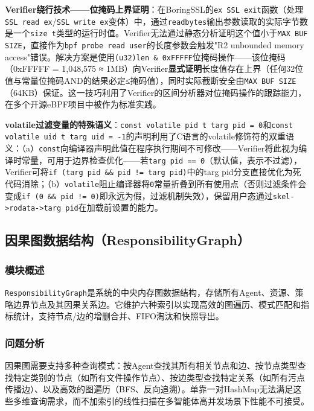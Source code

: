 \documentclass[a4paper]{ctexart}
\makeatletter
\renewcommand{\_}{%
  \ifmmode
    \nfss@text{\textunderscore}%
  \else
    \textunderscore\discretionary{}{}{}%
  \fi}
\makeatother
\begin{document}
\textbf{Verifier绕行技术——位掩码上界证明}：在BoringSSL的\texttt{ex\_SSL\_exit}函数（处理\texttt{SSL\_read\_ex}/\texttt{SSL\_write\_ex}变体）中，通过\texttt{readbytes}输出参数读取的实际字节数是一个\texttt{size\_t}类型的运行时值。Verifier无法通过静态分析证明这个值小于\texttt{MAX\_BUF\_SIZE}，直接作为\texttt{bpf\_probe\_read\_user}的长度参数会触发"R2 unbounded memory access"错误。解决方案是使用\texttt{(u32)len \& 0xFFFFF}位掩码操作——该位掩码（0xFFFFF = 1,048,575 ≈ 1MB）向Verifier\textbf{显式证明}长度值存在上界（任何32位值与常量位掩码AND的结果必定≤掩码值），同时实际截断安全由\texttt{MAX\_BUF\_SIZE}（64KB）保证。这一技巧利用了Verifier的区间分析器对位掩码操作的跟踪能力，在多个开源eBPF项目中被作为标准实践。


\textbf{volatile过滤变量的特殊语义}：\texttt{const volatile pid\_t targ\_pid = 0}和\texttt{const volatile uid\_t targ\_uid = -1}的声明利用了C语言的volatile修饰符的双重语义：（a）\texttt{const}向编译器声明此值在程序执行期间不可修改——Verifier将此视为编译时常量，可用于边界检查优化——若\texttt{targ\_pid == 0}（默认值，表示不过滤），Verifier可将\texttt{if (targ\_pid \&\& pid != targ\_pid)}中的targ\_pid分支直接优化为死代码消除；（b）\texttt{volatile}阻止编译器将\texttt{0}常量折叠到所有使用点（否则过滤条件会变成\texttt{if (0 \&\& pid != 0)}即永远为假，过滤机制失效），保留用户态通过\texttt{skel->rodata->targ\_pid}在加载前设置的能力。


\subsection{因果图数据结构（ResponsibilityGraph）}



\subsubsection{模块概述}



\texttt{ResponsibilityGraph}是系统的中央内存图数据结构，存储所有Agent、资源、策略边界节点及其因果关系边。它维护六种索引以实现高效的图遍历、模式匹配和指标统计，支持节点/边的增删合并、FIFO淘汰和快照导出。


\subsubsection{问题分析}



因果图需要支持多种查询模式：按Agent查找其所有相关节点和边、按节点类型查找特定类别的节点（如所有文件操作节点）、按边类型查找特定关系（如所有污点传播边）、以及高效的图遍历（BFS、反向追溯）。单靠一对HashMap无法满足这些多维查询需求，而不加索引的线性扫描在多智能体高并发场景下性能不可接受。
\end{document}
